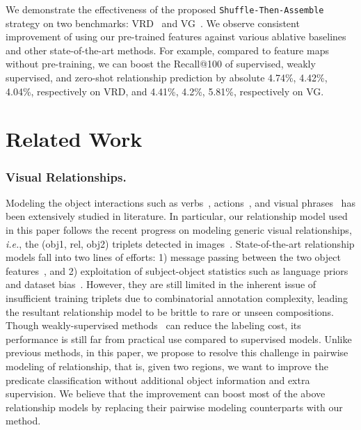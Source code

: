 \documentclass[runningheads]{llncs}
\newcommand{\ie}{\textit{i.e.}}
\begin{document}
We demonstrate the effectiveness of the proposed \texttt{Shuffle-Then-Assemble} strategy on two benchmarks: VRD~\cite{lu2016visual} and VG~\cite{krishna2017visual}. We observe consistent improvement of using our pre-trained features against various ablative baselines and other state-of-the-art methods. For example, compared to feature maps without pre-training, we can boost the Recall@100 of supervised, weakly supervised, and zero-shot relationship prediction by absolute 4.74\%, 4.42\%, 4.04\%, respectively on VRD, and 4.41\%, 4.2\%, 5.81\%, respectively on VG. 

\section{Related Work}
\subsubsection{Visual Relationships.}
Modeling the object interactions such as verbs~\cite{gupta2008beyond,chao2015hico}, actions~\cite{gupta2009observing,ramanathan2015learning,yao2010modeling}, and visual phrases~\cite{yatskar2016situation,atzmon2016learning,sadeghi2011recognition,desai2012detecting} has been extensively studied in literature. In particular, our relationship model used in this paper follows the recent progress on modeling generic visual relationships, \ie, the (obj1, rel, obj2) triplets detected in images~\cite{lu2016visual,zhang2017visual}. State-of-the-art relationship models fall into two lines of efforts: 1) message passing between the two object features~\cite{yin2018zoom,li2017vip,xu2017scenegraph}, and 2) exploitation of subject-object statistics such as language priors~\cite{lu2016visual,li2017scene,Zhuang_2017_ICCV} and dataset bias~\cite{zellers2017neural,zhang2017relationship,dai2017detecting}. However, they are still limited in the inherent issue of insufficient training triplets due to combinatorial annotation complexity, leading the resultant relationship model to be brittle to rare or unseen compositions. Though weakly-supervised methods~\cite{zhang2017ppr,peyre2017weakly,wei2018revisiting} can reduce the labeling cost, its performance is still far from practical use compared to supervised models. Unlike previous methods, in this paper, we propose to resolve this challenge in pairwise modeling of relationship, that is, given two regions, we want to improve the predicate classification without additional object information and extra supervision. We believe that the improvement can boost most of the above relationship models by replacing their pairwise modeling counterparts with our method.
\end{document}
